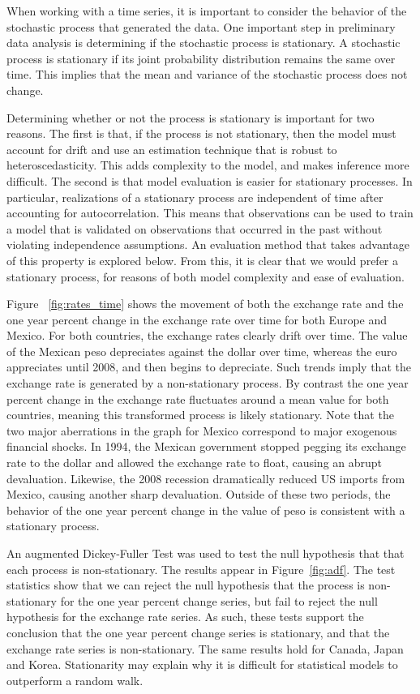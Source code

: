 \documentclass{sig-alternate-05-2015}
\begin{document}
When working with a time series, it is important to consider the behavior of the stochastic process that generated the data. One important step in preliminary data analysis is determining if the stochastic process is stationary. A stochastic process is stationary if its joint probability distribution remains the same over time. This implies that the mean and variance of the stochastic process does not change.
\par{} Determining whether or not the process is stationary is important for two reasons. The first is that, if the process is not stationary, then the model must account for drift and use an estimation technique that is robust to heteroscedasticity. This adds complexity to the model, and makes inference more difficult. The second is that model evaluation is easier for stationary processes. In particular, realizations of a stationary process are independent of time after accounting for autocorrelation. This means that observations can be used to train a model that is validated on observations that occurred in the past without violating independence assumptions. An evaluation method that takes advantage of this property is explored below. From this, it is clear that we would prefer a stationary process, for reasons of both model complexity and ease of evaluation.
\par{} Figure ~\ref{fig:rates_time} shows the movement of both the exchange rate and the one year percent change in the exchange rate over time for both Europe and Mexico. For both countries, the exchange rates clearly drift over time. The value of the Mexican peso depreciates against the dollar over time, whereas the euro appreciates until 2008, and then begins to depreciate. Such trends imply that the exchange rate is generated by a non-stationary process. By contrast the one year percent change in the exchange rate fluctuates around a mean value for both countries, meaning this transformed process is likely stationary. Note that the two major aberrations in the graph for Mexico correspond to major exogenous financial shocks. In 1994, the Mexican government stopped pegging its exchange rate to the dollar and allowed the exchange rate to float, causing an abrupt devaluation. Likewise, the 2008 recession dramatically reduced US imports from Mexico, causing another sharp devaluation. Outside of these two periods, the behavior of the one year percent change in the value of peso is consistent with a stationary process.
\par{} An augmented Dickey-Fuller Test was used to test the null hypothesis that that each process is non-stationary. The results appear in Figure~\ref{fig:adf}. The test statistics show that we can reject the null hypothesis that the process is non-stationary for the one year percent change series, but fail to reject the null hypothesis for the exchange rate series. As such, these tests support the conclusion that the one year percent change series is stationary, and that the exchange rate series is non-stationary. The same results hold for Canada, Japan and Korea. Stationarity may explain why it is difficult for statistical models to outperform a random walk.
\end{document}
